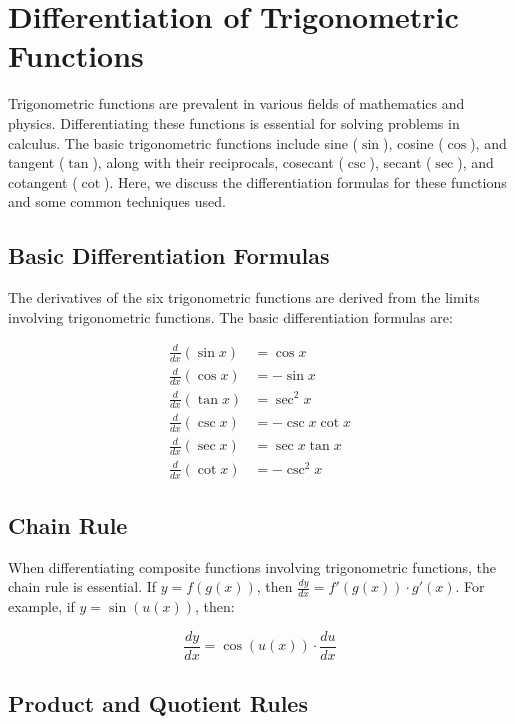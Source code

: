 \documentclass[a4paper,12pt]{book}
\newcounter{problem}
\newcounter{example}
\begin{document}
\section{Differentiation of Trigonometric Functions}

Trigonometric functions are prevalent in various fields of mathematics and physics. Differentiating these functions is essential for solving problems in calculus. The basic trigonometric functions include sine (\(\sin\)), cosine (\(\cos\)), and tangent (\(\tan\)), along with their reciprocals, cosecant (\(\csc\)), secant (\(\sec\)), and cotangent (\(\cot\)). Here, we discuss the differentiation formulas for these functions and some common techniques used.

\subsection*{Basic Differentiation Formulas}

The derivatives of the six trigonometric functions are derived from the limits involving trigonometric functions. The basic differentiation formulas are:

\begin{align}
\frac{d}{dx} (\sin x) &= \cos x \\
\frac{d}{dx} (\cos x) &= -\sin x \\
\frac{d}{dx} (\tan x) &= \sec^2 x \\
\frac{d}{dx} (\csc x) &= -\csc x \cot x \\
\frac{d}{dx} (\sec x) &= \sec x \tan x \\
\frac{d}{dx} (\cot x) &= -\csc^2 x
\end{align}

\subsection*{Chain Rule}

When differentiating composite functions involving trigonometric functions, the chain rule is essential. If \(y = f(g(x))\), then \(\frac{dy}{dx} = f'(g(x)) \cdot g'(x)\). For example, if \(y = \sin(u(x))\), then:

\begin{equation}
\frac{dy}{dx} = \cos(u(x)) \cdot \frac{du}{dx}
\end{equation}

\subsection*{Product and Quotient Rules}
\end{document}

